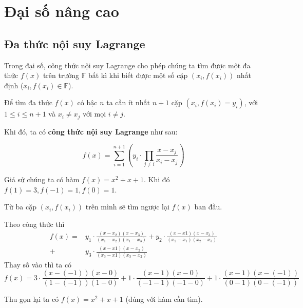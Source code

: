 \documentclass{mynotes}
\newcommand{\FF}{\mathbb{F}}
\begin{document}
\chapter{Đại số nâng cao}

\section{Đa thức nội suy Lagrange}

Trong đại số, công thức nội suy Lagrange cho phép chúng ta tìm được một đa thức $f(x)$ trên trường $\FF$ bất kì khi biết được một số cặp $(x_i, f(x_i))$ nhất định ($x_i, f(x_i) \in \FF$).

Để tìm đa thức $f(x)$ có bậc $n$ ta cần ít nhất $n+1$ cặp $(x_i, f(x_i) = y_i)$, với $1 \leqslant i \leqslant n+1$ và $x_i \neq x_j$ với mọi $i \neq j$.

Khi đó, ta có \textbf{công thức nội suy Lagrange} như sau:

\begin{equation*}
    \displaystyle{f(x) = \sum_{i=1}^{n+1} \left(y_i \cdot \prod_{j \neq i} \frac{x - x_j}{x_i - x_j}\right)}
\end{equation*}

\begin{example}
    Giả sử chúng ta có hàm $f(x) = x^2 + x + 1$. Khi đó $f(1) = 3, f(-1) = 1, f(0) = 1$.

    Từ ba cặp $(x_i, f(x_i))$ trên mình sẽ tìm ngược lại $f(x)$ ban đầu.

    Theo công thức thì
    \begin{align*}
        f(x) = & y_1 \cdot \frac{(x - x_2) (x - x_3)}{(x_1 - x_2) (x_1 - x_3)} + y_2 \cdot \frac{(x - x1) (x - x_3)}{(x_2 - x_1) (x_2 - x_3)} \\
        + & y_3 \cdot \frac{(x - x1) (x - x_2)}{(x_3 - x1) (x_3 - x_2)}
    \end{align*}
    Thay số vào thì ta có
    \begin{equation*}
        \displaystyle{f(x) = 3 \cdot \frac{(x - (-1)) (x - 0)}{(1 - (-1)) (1 - 0)} + 1 \cdot \frac{(x - 1) (x - 0)}{(-1 - 1) (-1 - 0)} + 1 \cdot \frac{(x - 1) (x - (-1))}{(0 - 1) (0 - (-1))}}
    \end{equation*}

    Thu gọn lại ta có $f(x) = x^2 + x + 1$ (đúng với hàm cần tìm).
\end{example}
\end{document}
